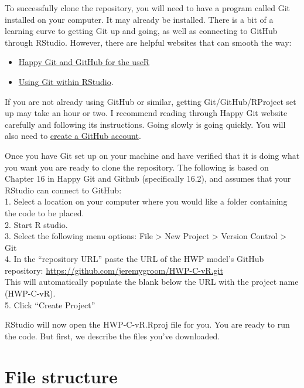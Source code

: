 \documentclass[
  openany]{book}
\providecommand{\tightlist}{%
  \setlength{\itemsep}{0pt}\setlength{\parskip}{0pt}}
\begin{document}
To successfully clone the repository, you will need to have a program
called Git installed on your computer. It may already be installed.
There is a bit of a learning curve to getting Git up and going, as well
as connecting to GitHub through RStudio. However, there are helpful
websites that can smooth the way:

\begin{itemize}
\tightlist
\item
  \href{https://happygitwithr.com/index.html}{Happy Git and GitHub for
  the useR}\\
\item
  \href{https://cfss.uchicago.edu/setup/git-with-rstudio/}{Using Git
  within RStudio}.
\end{itemize}

If you are not already using GitHub or similar, getting
Git/GitHub/RProject set up may take an hour or two. I recommend reading
through Happy Git website carefully and following its instructions.
Going slowly is going quickly. You will also need to
\href{https://github.com/signup?ref_cta=Sign+up\&ref_loc=header+logged+out\&ref_page=\%2F\&source=header-home}{create
a GitHub account}.

Once you have Git set up on your machine and have verified that it is
doing what you want you are ready to clone the repository. The following
is based on Chapter 16 in Happy Git and Github (specifically 16.2), and
assumes that your RStudio can connect to GitHub:\\
1. Select a location on your computer where you would like a folder
containing the code to be placed.\\
2. Start R studio.\\
3. Select the following menu options: File \textgreater{} New Project
\textgreater{} Version Control \textgreater{} Git\\
4. In the ``repository URL'' paste the URL of the HWP model's GitHub
repository: \url{https://github.com/jeremygroom/HWP-C-vR.git}\\
This will automatically populate the blank below the URL with the
project name (HWP-C-vR).\\
5. Click ``Create Project''

RStudio will now open the HWP-C-vR.Rproj file for you. You are ready to
run the code. But first, we describe the files you've downloaded.

\hypertarget{dnld-files}{%
\section{File structure}\label{dnld-files}}
\end{document}
